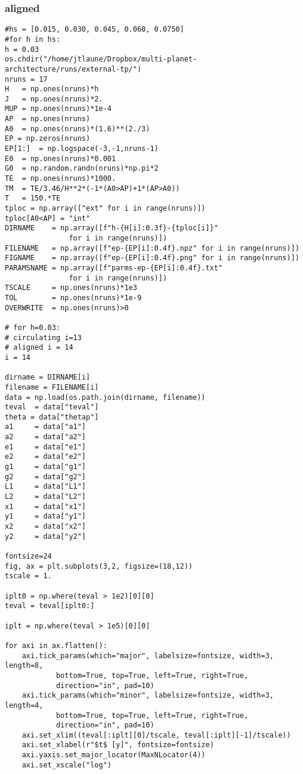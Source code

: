 \documentclass[11pt]{article}
\begin{document}
\subsubsection{aligned}
\label{sec:org86deb13}
\begin{verbatim}
#hs = [0.015, 0.030, 0.045, 0.060, 0.0750]
#for h in hs:
h = 0.03
os.chdir("/home/jtlaune/Dropbox/multi-planet-architecture/runs/external-tp/")
nruns = 17
H   = np.ones(nruns)*h
J   = np.ones(nruns)*2.
MUP = np.ones(nruns)*1e-4
AP  = np.ones(nruns)
A0  = np.ones(nruns)*(1.6)**(2./3)
EP = np.zeros(nruns)
EP[1:]  = np.logspace(-3,-1,nruns-1)
E0  = np.ones(nruns)*0.001
G0  = np.random.randn(nruns)*np.pi*2
TE  = np.ones(nruns)*1000.
TM  = TE/3.46/H**2*(-1*(A0>AP)+1*(AP>A0))
T   = 150.*TE
tploc = np.array(["ext" for i in range(nruns)])
tploc[A0<AP] = "int"
DIRNAME    = np.array([f"h-{H[i]:0.3f}-{tploc[i]}"
		       for i in range(nruns)])
FILENAME   = np.array([f"ep-{EP[i]:0.4f}.npz" for i in range(nruns)])
FIGNAME    = np.array([f"ep-{EP[i]:0.4f}.png" for i in range(nruns)])
PARAMSNAME = np.array([f"parms-ep-{EP[i]:0.4f}.txt"
		       for i in range(nruns)])
TSCALE     = np.ones(nruns)*1e3
TOL        = np.ones(nruns)*1e-9
OVERWRITE  = np.ones(nruns)>0

# for h=0.03:
# circulating i=13
# aligned i = 14
i = 14

dirname = DIRNAME[i]
filename = FILENAME[i]
data = np.load(os.path.join(dirname, filename))
teval  = data["teval"]
theta = data["thetap"]
a1     = data["a1"]
a2     = data["a2"]
e1     = data["e1"]
e2     = data["e2"]
g1     = data["g1"]
g2     = data["g2"]
L1     = data["L1"]
L2     = data["L2"]
x1     = data["x1"]
y1     = data["y1"]
x2     = data["x2"]
y2     = data["y2"]

fontsize=24
fig, ax = plt.subplots(3,2, figsize=(18,12))
tscale = 1.

iplt0 = np.where(teval > 1e2)[0][0]
teval = teval[iplt0:]

iplt = np.where(teval > 1e5)[0][0]

for axi in ax.flatten():
    axi.tick_params(which="major", labelsize=fontsize, width=3, length=8,
		    bottom=True, top=True, left=True, right=True,
		    direction="in", pad=10)
    axi.tick_params(which="minor", labelsize=fontsize, width=3, length=4,
		    bottom=True, top=True, left=True, right=True,
		    direction="in", pad=10)
    axi.set_xlim((teval[:iplt][0]/tscale, teval[:iplt][-1]/tscale))
    axi.set_xlabel(r"$t$ [y]", fontsize=fontsize)
    axi.yaxis.set_major_locator(MaxNLocator(4))
    axi.set_xscale("log")


\end{verbatim}
\end{document}
